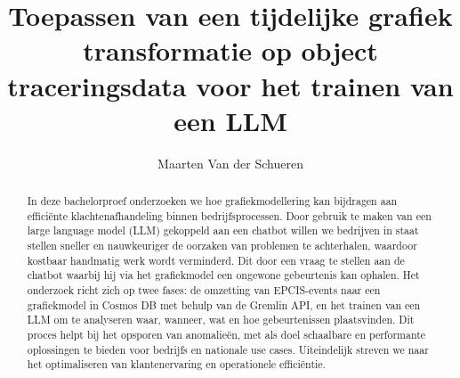 \documentclass{hogent-article}
\title{Toepassen van een tijdelijke grafiek transformatie op object traceringsdata voor het trainen van een LLM}
\author{Maarten Van der Schueren}
\begin{document}
\begin{abstract}
    In deze bachelorproef onderzoeken we hoe grafiekmodellering kan bijdragen aan efficiënte klachtenafhandeling binnen bedrijfsprocessen. 
    Door gebruik te maken van een large language model (LLM) gekoppeld aan een chatbot willen we bedrijven in staat stellen sneller en nauwkeuriger de oorzaken van problemen te achterhalen, waardoor kostbaar handmatig werk wordt verminderd. 
    Dit door een vraag te stellen aan de chatbot waarbij hij via het grafiekmodel een ongewone gebeurtenis kan ophalen. Het onderzoek richt zich op twee fases: de omzetting van EPCIS-events naar een grafiekmodel in Cosmos DB met behulp van de Gremlin API, en het trainen van een LLM om te analyseren waar, wanneer, wat en hoe gebeurtenissen plaatsvinden. 
    Dit proces helpt bij het opsporen van anomalieën, met als doel schaalbare en performante oplossingen te bieden voor bedrijfs\- en nationale use cases. 
    Uiteindelijk streven we naar het optimaliseren van klantenervaring en operationele efficiëntie.
\end{abstract}

\tableofcontents


\newpage
\printbibliography[heading=bibintoc]
\end{document}
